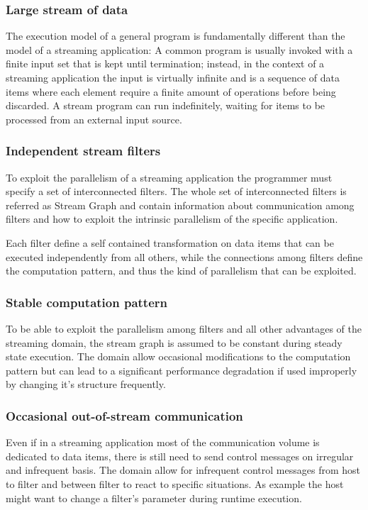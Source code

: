 \documentclass[../main.tex]{subfiles}
\begin{document}
\subsubsection{Large stream of data}
The execution model of a general program is fundamentally different than the model of a streaming application: A common program is usually invoked with a finite input set that is kept until termination; instead, in the context of a streaming application the input is virtually infinite and is a sequence of data items where each element require a finite amount of operations before being discarded. A stream program can run indefinitely, waiting for items to be processed from an external input source.

\subsubsection{Independent stream filters}
To exploit the parallelism of a streaming application the programmer must specify a set of interconnected filters. The whole set of interconnected filters is referred as Stream Graph and contain information about communication among filters and how to exploit the intrinsic parallelism of the specific application.

Each filter define a self contained transformation on data items that can be executed independently from all others, while the connections among filters define the computation pattern, and thus the kind of parallelism that can be exploited.

\subsubsection{Stable computation pattern}
To be able to exploit the parallelism among filters and all other advantages of the streaming domain, the stream graph is assumed to be constant during steady state execution. The domain allow occasional modifications to the computation pattern but can lead to a significant performance degradation if used improperly by changing it's structure frequently.

\subsubsection{Occasional out-of-stream communication}
Even if in a streaming application most of the communication volume is dedicated to data items, there is still need to send control messages on irregular and infrequent basis. The domain allow for infrequent control messages from host to filter and between filter to react to specific situations. As example the host might want to change a filter's parameter during runtime execution.
\end{document}
